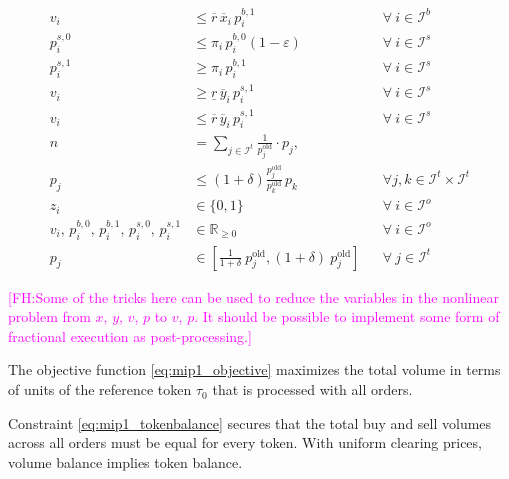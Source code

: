 \documentclass[11pt,parskip=full]{scrartcl}%
\newcommand*{\itokens}{\mathcal{I}^t}       %
\newcommand*{\iorders}{\mathcal{I}^o}       %
\newcommand*{\ibuyorders}{\mathcal{I}^b}    %
\newcommand*{\isellorders}{\mathcal{I}^s}   %
\newcommand{\FH}[1]{\textcolor{magenta}{[FH:#1]}}
\begin{document}
\begin{small}
\begin{subequations}
\begin{align}
  \\[1mm]
  v_i
  &\le \overline{r} \, \overline{x}_i \, p^{b,1}_i
  && \forall \> i \in \ibuyorders
  \label{eq:mip1_buyorder_volume_ub}
  \\[2mm]
  p^{s,0}_i
  &\le \pi_i \, p^{b,0}_i (1-\varepsilon)
  && \forall \> i \in \isellorders
  \label{eq:mip1_sellorder_disj_0}
  \\[1mm]
  p^{s,1}_i
  &\ge \pi_i \, p^{b,1}_i
  && \forall \> i \in \isellorders
  \label{eq:mip1_sellorder_disj_1}
  \\[1mm]
  v_i
  &\ge \underline{r} \, \overline{y}_i \, p^{s,1}_i
  && \forall \> i \in \isellorders
  \label{eq:mip1_sellorder_volume_lb}
  \\[1mm]
  v_i
  &\le \overline{r} \, \overline{y}_i \, p^{s,1}_i
  && \forall \> i \in \isellorders
  \label{eq:mip1_sellorder_volume_ub}
  \\[2mm]
  n
  &= \sum\limits_{j \in \itokens} \frac{1}{p^\mathrm{old}_j} \cdot p_j,
  \label{eq:mip1_reftoken}
  \\[1mm]
  p_j
  &\le \left(1+\delta\right) \frac{p^\mathrm{old}_j}{p^\mathrm{old}_k} \, p_k
  && \forall j,k \in \itokens \times \itokens
  \label{eq:mip1_maxfluct}
  \\[2mm]
  z_i
  &\in \{0,1\}
  && \forall \> i \in \iorders
  \\[1mm]
  v_i, \, p^{b,0}_i, \, p^{b,1}_i, \, p^{s,0}_i, \, p^{s,1}_i
  &\in \mathbb{R}_{\ge 0}
  && \forall \> i \in \iorders
  \\[1mm]
  p_j
  &\in \left[ \frac{1} {1+\delta} \> p^\mathrm{old}_j, (1+\delta) \> p^\mathrm{old}_j \right]
  && \forall \> j \in \itokens
\end{align}
\label{eq:mip1}
\end{subequations}
\end{small}

\FH{Some of the tricks here can be used to reduce the variables in the nonlinear problem from $x$, $y$, $v$, $p$ to $v$, $p$. It should be possible to implement some form of fractional execution as post-processing.}

The objective function \eqref{eq:mip1_objective} maximizes the total volume in terms of units of
the reference token $ \tau_0 $ that is processed with all orders.

Constraint \eqref{eq:mip1_tokenbalance} secures that the total buy and sell volumes across all
orders must be equal for every token.
With uniform clearing prices, volume balance implies token balance.
\end{document}
